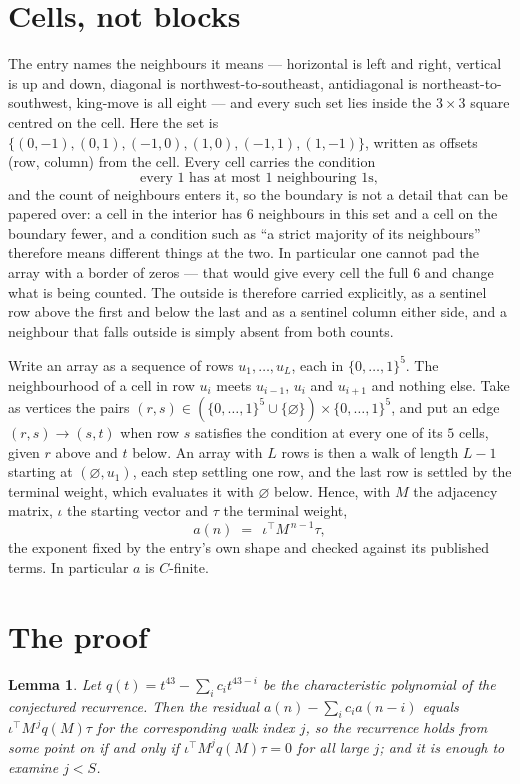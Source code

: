 \documentclass[11pt,a4paper]{article}
\theoremstyle{plain}
\newtheorem{lemma}[theorem]{Lemma}
\theoremstyle{definition}
\begin{document}
\section{Cells, not blocks}

The entry names the neighbours it means --- horizontal is left and right, vertical is up and
down, diagonal is northwest-to-southeast, antidiagonal is northeast-to-southwest, king-move is
all eight --- and every such set lies inside the $3\times3$ square centred on the cell. Here
the set is $\{(0,-1), (0,1), (-1,0), (1,0), (-1,1), (1,-1)\}$, written as offsets (row, column) from the cell. Every cell carries
the condition
\[
\text{every 1 has at most 1 neighbouring 1s},
\]
and the count of neighbours enters it, so the boundary is not a detail that can be papered
over: a cell in the interior has $6$ neighbours in this set and a cell on the boundary
fewer, and a condition such as ``a strict majority of its neighbours'' therefore means
different things at the two. In particular one cannot pad the array with a border of zeros ---
that would give every cell the full $6$ and change what is being counted. The outside is
therefore carried
explicitly, as a sentinel row above the first and below the last and as a sentinel column
either side, and a neighbour that falls outside is simply absent from both counts.

Write an array as a sequence of rows $u_1,\dots,u_L$, each in
$\{0,\dots,1\}^{5}$. The neighbourhood of a cell in row $u_i$ meets $u_{i-1}$,
$u_i$ and $u_{i+1}$ and nothing else. Take as vertices the pairs
$(r,s)\in(\{0,\dots,1\}^{5}\cup\{\varnothing\})\times\{0,\dots,1\}^{5}$,
and put an edge $(r,s)\to(s,t)$ when row $s$ satisfies the condition at every one of its
$5$ cells, given $r$ above and $t$ below. An array with $L$ rows is then a walk of length
$L-1$ starting at $(\varnothing,u_1)$, each step settling one row, and the last row is
settled by the terminal weight, which evaluates it with $\varnothing$ below. Hence,
with $M$ the adjacency matrix, $\iota$ the starting vector and $\tau$ the terminal weight,
\[
a(n)\;=\;\,\iota^{\!\top}M^{\,n-1}\tau ,
\]
the exponent fixed by the entry's own shape and checked against its published terms. In
particular $a$ is $C$-finite.

\section{The proof}

\begin{lemma}\label{lem:crit}
Let $q(t)=t^{43}-\sum_i c_it^{43-i}$ be the characteristic polynomial of the
conjectured recurrence. Then the residual $a(n)-\sum_ic_ia(n-i)$ equals
$\iota^{\!\top}M^{\,j}q(M)\tau$ for the corresponding walk index $j$, so the
recurrence holds from some point on if and only if $\iota^{\!\top}M^{j}q(M)\tau=0$ for all
large $j$; and it is enough to examine $j<S$.
\end{lemma}
\end{document}

